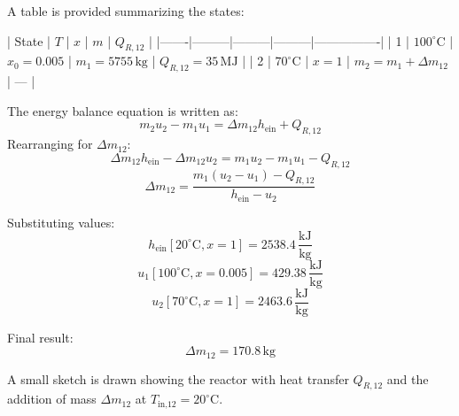A table is provided summarizing the states:  

| State | \( T \) | \( x \) | \( m \) | \( Q_{R,12} \) |  
|-------|---------|---------|---------|----------------|  
| 1     | \( 100^\circ\text{C} \) | \( x_0 = 0.005 \) | \( m_1 = 5755 \, \text{kg} \) | \( Q_{R,12} = 35 \, \text{MJ} \) |  
| 2     | \( 70^\circ\text{C} \) | \( x = 1 \) | \( m_2 = m_1 + \Delta m_{12} \) | — |  

The energy balance equation is written as:  
\[
m_2 u_2 - m_1 u_1 = \Delta m_{12} h_{\text{ein}} + Q_{R,12}
\]  
Rearranging for \( \Delta m_{12} \):  
\[
\Delta m_{12} h_{\text{ein}} - \Delta m_{12} u_2 = m_1 u_2 - m_1 u_1 - Q_{R,12}
\]  
\[
\Delta m_{12} = \frac{m_1 (u_2 - u_1) - Q_{R,12}}{h_{\text{ein}} - u_2}
\]  

Substituting values:  
\[
h_{\text{ein}}[20^\circ\text{C}, x=1] = 2538.4 \, \frac{\text{kJ}}{\text{kg}}
\]  
\[
u_1[100^\circ\text{C}, x=0.005] = 429.38 \, \frac{\text{kJ}}{\text{kg}}
\]  
\[
u_2[70^\circ\text{C}, x=1] = 2463.6 \, \frac{\text{kJ}}{\text{kg}}
\]  

Final result:  
\[
\Delta m_{12} = 170.8 \, \text{kg}
\]  

A small sketch is drawn showing the reactor with heat transfer \( Q_{R,12} \) and the addition of mass \( \Delta m_{12} \) at \( T_{\text{in,12}} = 20^\circ\text{C} \).